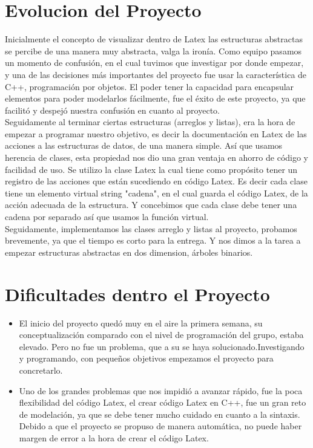 \documentclass[12pt,letterpaper]{article}     %
\begin{document}
\section{Evolucion del Proyecto}

Inicialmente el concepto de visualizar dentro de Latex las estructuras abstractas se percibe de una manera muy abstracta, valga la ironía. Como equipo pasamos un momento de confusión, en el cual tuvimos que investigar por donde empezar, y una de las decisiones más importantes del proyecto fue usar la característica de C++, programación por objetos. El poder tener la capacidad para encapsular elementos para poder modelarlos fácilmente, fue el éxito de este proyecto, ya que facilitó y despejó nuestra confusión en cuanto al proyecto.\\

Seguidamente al terminar ciertas estructuras (arreglos y listas), era la hora de empezar a programar nuestro objetivo, es decir la documentación en Latex de las acciones a las estructuras de datos, de una manera simple. Así que usamos herencia de clases, esta propiedad nos dio una gran ventaja en ahorro de código y facilidad de uso. Se utilizo la clase Latex la cual tiene como propósito tener un registro de las acciones que están sucediendo en código Latex. Es decir cada clase tiene un elemento virtual string "cadena", en el cual guarda el código Latex, de la acción adecuada de la estructura. Y concebimos que cada clase debe tener una cadena por separado así que usamos la función virtual.\\

Seguidamente, implementamos las clases arreglo y listas al proyecto, probamos brevemente, ya que el tiempo es corto para la entrega. Y nos dimos a la tarea a empezar estructuras abstractas en dos dimension, árboles binarios.\\

\section{Dificultades dentro el Proyecto}

\begin{itemize}

\item El inicio del proyecto quedó muy en el aire la primera semana, su conceptualización comparado con el nivel de programación del grupo, estaba elevado. Pero no fue un problema, que a su se haya solucionado.Investigando y programando, con pequeños objetivos empezamos el proyecto para concretarlo.

\item Uno de los grandes problemas que nos impidió a avanzar rápido, fue la poca flexibilidad del código Latex, el crear código Latex en C++, fue un gran reto de modelación, ya que se debe tener mucho cuidado en cuanto a la sintaxis. Debido a que el proyecto se propuso de manera automática, no puede haber margen de error a la hora de crear el código Latex.

\end{itemize}
\end{document}
